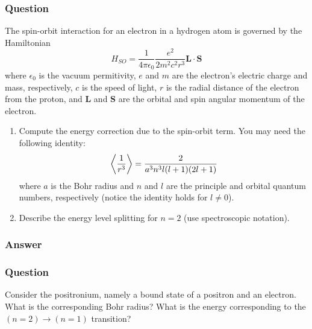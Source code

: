 \subsubsection{Question}
The spin-orbit interaction for an electron in a hydrogen atom is governed by the Hamiltonian
\begin{equation*}
	H_{SO} = \frac{1}{4\pi \epsilon_0}\frac{e^2}{2m^2c^2r^3}\mathbf{L}\cdot\mathbf{S} 
\end{equation*}
where $\epsilon_0$ is the vacuum permitivity, $e$ and $m$ are the electron's electric charge and mass, respectively, $c$ is the speed of light, $r$ is the radial distance of the electron from the proton, and $\mathbf{L}$ and $\mathbf{S}$ are the orbital and spin angular momentum of the electron.
\begin{enumerate}
	\item Compute the energy correction due to the spin-orbit term. You may need the following identity:
	\begin{equation*}
		\expval{\frac{1}{r^3}} = \frac{2}{a^3n^3l(l+1)(2l+1)}
	\end{equation*}
	where $a$ is the Bohr radius and $n$ and $l$ are the principle and orbital quantum numbers, respectively (notice the identity holds for $l\ne 0$).
	\item Describe the energy level splitting for $n=2$ (use spectroscopic notation).
\end{enumerate}
\subsubsection{Answer}



\subsubsection{Question}
Consider the positronium, namely a bound state of a positron and an electron. What is the corresponding Bohr radius? What is the energy corresponding to the $(n=2)\to(n=1)$ transition?

